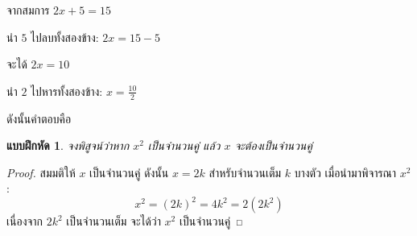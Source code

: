 \documentclass{kkubee_edit_all}
\newtheorem{exercise}{แบบฝึกหัด}[chapter]
\begin{document}
\begin{solution}
\begin{solsteps}
    \item จากสมการ $2x + 5 = 15$
    \item นำ $5$ ไปลบทั้งสองข้าง: $2x = 15 - 5$
    \item จะได้ $2x = 10$
    \item นำ $2$ ไปหารทั้งสองข้าง: $x = \frac{10}{2}$
    \item ดังนั้นคำตอบคือ 
\end{solsteps}
\end{solution}

\begin{exercise}
จงพิสูจน์ว่าหาก $x^2$ เป็นจำนวนคู่ แล้ว $x$ จะต้องเป็นจำนวนคู่
\end{exercise}

\begin{proof}
สมมติให้ $x$ เป็นจำนวนคู่ ดังนั้น $x = 2k$ สำหรับจำนวนเต็ม $k$ บางตัว
เมื่อนำมาพิจารณา $x^2$:
\[ x^2 = (2k)^2 = 4k^2 = 2(2k^2) \]
เนื่องจาก $2k^2$ เป็นจำนวนเต็ม จะได้ว่า $x^2$ เป็นจำนวนคู่ \qedhere
\end{proof}
\end{document}
